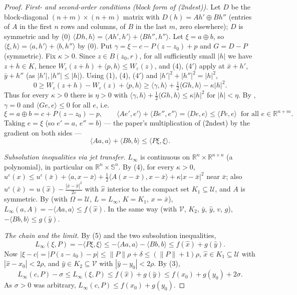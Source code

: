 \begin{proof}
\emph{First- and second-order conditions (block form of (2ndest)).} Let $D$ be the block-diagonal $(n+m)\times(n+m)$ matrix with $D(h)=A h'\oplus B h''$ (entries of $A$ in the first $n$ rows and columns, of $B$ in the last $m$, zero elsewhere); $D$ is symmetric and by (0) $\langle Dh,h\rangle=\langle Ah',h'\rangle+\langle Bh'',h''\rangle$. Let $\xi=a\oplus b$, so $\langle\xi,h\rangle=\langle a,h'\rangle+\langle b,h''\rangle$ by (0). Put $\gamma=\xi-c-P(z-z_0)+p$ and $G=D-P$ (symmetric). Fix $\kappa>0$. Since $z\in B(z_0,r)$, for all sufficiently small $|h|$ we have $z+h\in K$, hence $W_\varepsilon(z+h)+\langle p,h\rangle\le W_\varepsilon(z)$, and (4), (4$'$) apply at $\bar x+h'$, $\bar y+h''$ (as $|h'|,|h''|\le|h|$). Using (1), (4), (4$'$) and $|h'|^2+|h''|^2=|h|^2$,
\[
0\ge W_\varepsilon(z+h)-W_\varepsilon(z)+\langle p,h\rangle\ge\langle\gamma,h\rangle+\tfrac12\langle Gh,h\rangle-\kappa|h|^2 .
\]
Thus for every $\kappa>0$ there is $\eta>0$ with $\langle\gamma,h\rangle+\frac12\langle Gh,h\rangle\le\kappa|h|^2$ for $|h|<\eta$. By , $\gamma=0$ and $\langle Ge,e\rangle\le0$ for all $e$, i.e.
\[
\xi=a\oplus b=c+P(z-z_0)-p,\qquad \langle Ae',e'\rangle+\langle Be'',e''\rangle=\langle De,e\rangle\le\langle Pe,e\rangle\ \text{ for all }e\in\mathbb R^{n+m}.
\]
Taking $e=\xi$ (so $e'=a$, $e''=b$) --- the paper's multiplication of (2ndest) by the gradient on both sides ---
\[
\langle Aa,a\rangle+\langle Bb,b\rangle\le\langle P\xi,\xi\rangle . \tag{5}
\]

\emph{Subsolution inequalities via jet transfer.} $L_\infty$ is continuous on $\mathbb R^n\times\mathbb R^{n\times n}$ (a polynomial), in particular on $\mathbb R^n\times\mathbb S^n$. By (4), for every $\kappa>0$, $u^\varepsilon(x)\le u^\varepsilon(\bar x)+\langle a,x-\bar x\rangle+\frac12\langle A(x-\bar x),x-\bar x\rangle+\kappa|x-\bar x|^2$ near $\bar x$; also $u^\varepsilon(\bar x)=u(\hat x)-\frac{|\bar x-\hat x|^2}{2\varepsilon}$ with $\hat x$ interior to the compact set $K_1\subseteq\mathcal U$, and $A$ is symmetric. By  (with $\Omega=\mathcal U$, $L=L_\infty$, $K=K_1$, $x=\bar x$), $L_\infty(a,A)=-\langle Aa,a\rangle\le f(\hat x)$. In the same way (with $\mathcal V$, $K_2$, $\bar y$, $\hat y$, $v$, $g$), $-\langle Bb,b\rangle\le g(\hat y)$.

\emph{The chain and the limit.} By (5) and the two subsolution inequalities,
\[
L_\infty(\xi,P)=-\langle P\xi,\xi\rangle\le-\langle Aa,a\rangle-\langle Bb,b\rangle\le f(\hat x)+g(\hat y).
\]
Now $|\xi-c|=|P(z-z_0)-p|\le\|P\|\rho+\delta\le(\|P\|+1)\rho$, $\hat x\in K_1\subseteq\mathcal U$ with $|\hat x-x_0|<2\rho$, and $\hat y\in K_2\subseteq\mathcal V$ with $|\hat y-y_0|<2\rho$. By (3),
\[
L_\infty(c,P)-\sigma\le L_\infty(\xi,P)\le f(\hat x)+g(\hat y)\le f(x_0)+g(y_0)+2\sigma .
\]
As $\sigma>0$ was arbitrary, $L_\infty(c,P)\le f(x_0)+g(y_0)$.
\end{proof}
